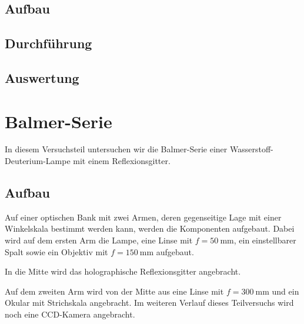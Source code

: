 \FloatBarrier
\subsection{Aufbau}

\begin{figure}[htbp]
    \centering
    \caption{%
        \cite[Abbildung~P402.1]{physik412-Anleitung}
    }
    \label{fig:P402.1}
\end{figure}

\FloatBarrier
\subsection{Durchführung}

\FloatBarrier
\subsection{Auswertung}


\FloatBarrier
\section{Balmer-Serie}

In diesem Versuchsteil untersuchen wir die Balmer-Serie einer
Wasserstoff-Deuterium-Lampe mit einem Reflexionsgitter.

\FloatBarrier
\subsection{Aufbau}

Auf einer optischen Bank mit zwei Armen, deren gegenseitige Lage mit einer
Winkelskala bestimmt werden kann, werden die Komponenten aufgebaut. Dabei wird
auf dem ersten Arm die Lampe, eine Linse mit $f = \SI{50}{\milli\meter}$, ein
einstellbarer Spalt sowie ein Objektiv mit $f = \SI{150}{\milli\meter}$
aufgebaut.

In die Mitte wird das holographische Reflexionsgitter angebracht.

Auf dem zweiten Arm wird von der Mitte aus eine Linse mit $f =
\SI{300}{\milli\meter}$ und ein Okular mit Strichskala angebracht. Im weiteren
Verlauf dieses Teilversuchs wird noch eine CCD-Kamera angebracht.

